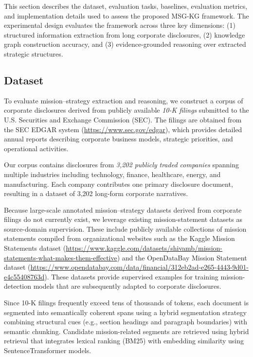 \documentclass[11pt]{article}
\begin{document}
This section describes the dataset, evaluation tasks, baselines, evaluation metrics, and implementation details used to assess the proposed MSG-KG framework. The experimental design evaluates the framework across three key dimensions: (1) structured information extraction from long corporate disclosures, (2) knowledge graph construction accuracy, and (3) evidence-grounded reasoning over extracted strategic structures.
\subsection{Dataset}

To evaluate mission--strategy extraction and reasoning, we construct a corpus of corporate disclosures derived from publicly available \textit{10-K filings} submitted to the U.S. Securities and Exchange Commission (SEC). The filings are obtained from the SEC EDGAR system (\url{https://www.sec.gov/edgar}), which provides detailed annual reports describing corporate business models, strategic priorities, and operational activities.

Our corpus contains disclosures from \textit{3,202 publicly traded companies} spanning multiple industries including technology, finance, healthcare, energy, and manufacturing. Each company contributes one primary disclosure document, resulting in a dataset of 3,202 long-form corporate narratives.

Because large-scale annotated mission--strategy datasets derived from corporate filings do not currently exist, we leverage existing mission-statement datasets as source-domain supervision. These include publicly available collections of mission statements compiled from organizational websites such as the Kaggle Mission Statements dataset (\url{https://www.kaggle.com/datasets/shivamb/mission-statements-what-makes-them-effective}) and the OpenDataBay Mission Statement dataset (\url{https://www.opendatabay.com/data/financial/312eb2ad-e265-4443-9d01-e4c55408763d}). These datasets provide supervised examples for training mission-detection models that are subsequently adapted to corporate disclosures.

Since 10-K filings frequently exceed tens of thousands of tokens, each document is segmented into semantically coherent spans using a hybrid segmentation strategy combining structural cues (e.g., section headings and paragraph boundaries) with semantic chunking. Candidate mission-related segments are retrieved using hybrid retrieval that integrates lexical ranking (BM25) with embedding similarity using SentenceTransformer models.
\end{document}
